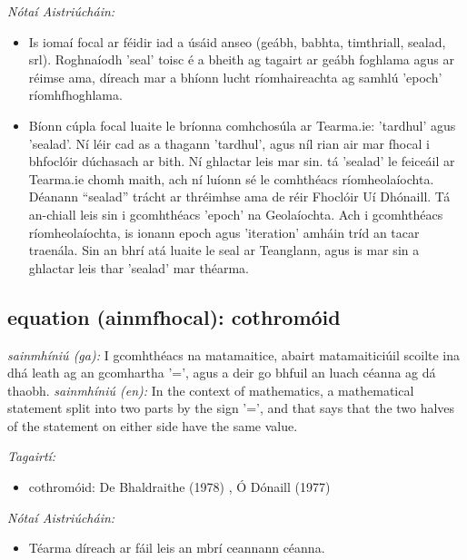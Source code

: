\documentclass{article}
\begin{document}
 \noindent \textit{Nótaí Aistriúcháin:}
\begin{itemize}
	\item Is iomaí focal ar féidir iad a úsáid anseo (geábh, babhta, timthriall, sealad, srl). Roghnaíodh 'seal' toisc é a bheith ag tagairt ar geábh foghlama agus ar réimse ama, díreach mar a bhíonn lucht ríomhaireachta ag samhlú 'epoch' ríomhfhoghlama.
	\item Bíonn cúpla focal luaite le bríonna comhchosúla ar Tearma.ie: 'tardhul' agus 'sealad'. Ní léir cad as a thagann 'tardhul', agus níl rian air mar fhocal i bhfoclóir dúchasach ar bith. Ní ghlactar leis mar sin. tá 'sealad' le feiceáil ar Tearma.ie chomh maith, ach ní luíonn sé le comhthéacs ríomheolaíochta. Déanann “sealad” trácht ar thréimhse ama de réir Fhoclóir Uí Dhónaill. Tá an-chiall leis sin i gcomhthéacs 'epoch' na Geolaíochta. Ach i gcomhthéacs ríomheolaíochta, is ionann epoch agus 'iteration' amháin tríd an tacar traenála. Sin an bhrí atá luaite le seal ar Teanglann, agus is mar sin a ghlactar leis thar 'sealad' mar théarma.
\end{itemize}


\subsection*{equation (ainmfhocal): cothromóid} 
 \noindent \textit{sainmhíniú (ga):} I gcomhthéacs na matamaitice, abairt matamaiticiúil scoilte ina dhá leath ag an gcomhartha '=', agus a deir go bhfuil an luach céanna ag dá thaobh.
\newline\newline
 \noindent \textit{sainmhíniú (en):} In the context of mathematics, a mathematical statement split into two parts by the sign '=', and that says that the two halves of the statement on either side have the same value.
\newline

 \noindent \textit{Tagairtí:}
\begin{itemize}
	\item cothromóid: De Bhaldraithe (1978) \cite{de-bhaldraithe}, Ó Dónaill (1977) \cite{odonaill}
\end{itemize}

 \noindent \textit{Nótaí Aistriúcháin:}
\begin{itemize}
	\item Téarma díreach ar fáil leis an mbrí ceannann céanna.
\end{itemize}
\end{document}
